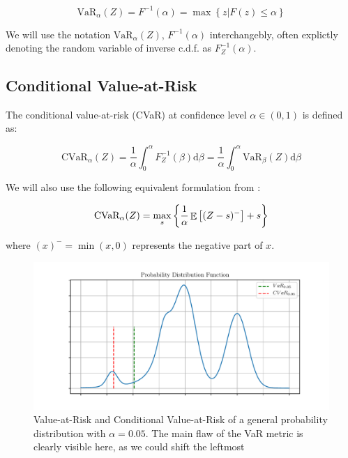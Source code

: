 \begin{equation}
\text{VaR}_\alpha(Z)=F^{-1}(\alpha)=\max\left\lbrace z | F(z) \le \alpha \right\rbrace
\end{equation}

We will use the notation $\text{VaR}_\alpha(Z)$, $F^{-1}(\alpha)$ interchangebly, often explictly denoting the random variable of inverse c.d.f. as $F^{-1}_Z(\alpha)$.

\subsection{Conditional Value-at-Risk}
The conditional value-at-risk (CVaR) at confidence level $\alpha \in (0,1)$ is defined as:

\begin{equation}
\text{CVaR}_\alpha(Z) = \dfrac{1}{\alpha}\int_0^\alpha F^{-1}_Z(\beta) \text{d}\beta = \dfrac{1}{\alpha}\int_0^\alpha \text{VaR}_\beta(Z) \text{d}\beta
\end{equation}

We will also use the following equivalent formulation from \cite{rockafellar2000optimization}:

\begin{equation}\label{eq:cvardef}
\text{CVaR}_\alpha(Z)=
\max_s\left\lbrace \dfrac{1}{\alpha}\mathop{\mathbb{E}}
\left[ (Z-s)^-\right] + s  \right\rbrace 
\end{equation}

where $(x)^- = \min(x, 0)$ represents the negative part of $x$.

\begin{figure}
\center
\includegraphics[width=\linewidth]{gfx/pdf.pdf}
\caption{Value-at-Risk and Conditional Value-at-Risk of a general probability distribution with $\alpha=0.05$. The main flaw of the VaR metric is clearly visible here, as we could shift the leftmost }
\end{figure}




